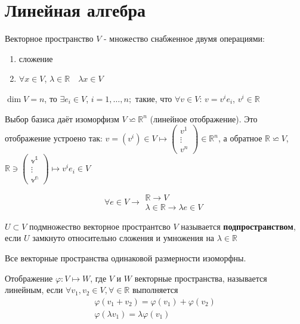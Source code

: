 \section{Линейная алгебра}
\begin{definition}
	Векторное пространство $ V $ - множество снабженное двумя операциями:
	\begin{enumerate}
		\item сложение
		\item $\forall x \in V$, $\lambda \in \mathbb{R} \quad \lambda x \in V$
	\end{enumerate}
\end{definition}
\begin{definition}
	$\operatorname{dim} V = n$,  то $\exists e_i \in V$, $ i = 1, \dots , n ;$ такие, что $ \forall v \in V $: $v = v^i e_i$, $v^i \in \mathbb{R}$
\end{definition}
 Выбор базиса даёт изоморфизм $V\backsimeq \mathbb{R}^n$ (линейное отображение). Это отображение устроено так: $ \displaystyle v = \left(v^i\right) \in V \longmapsto \left(\begin{array}{c}{v^{1}} \\ {\vdots} \\ {v^{n}}\end{array}\right) \in \mathbb{R}^{n}$, а обратное $ \mathbb{R} \backsimeq V $, $\mathbb{R \ni \left(\begin{array}{c}{v^{1}} \\ {\vdots} \\ {v^{n}}\end{array}\right)} \longmapsto v^i e_i \in V$
 
 $$
 \forall e \in V \longrightarrow \begin{array}{l}{\mathbb{R} \rightarrow V} \\ {\lambda \in \mathbb{R} \rightarrow \lambda e \in V}\end{array}
 $$
 
\begin{definition}
 	$U \subset V$ подмножество векторное пространтсво $ V $ называется \textbf{подпространством}, если $ U$ замкнуто относительно сложения и умножения на $ \lambda \in \mathbb{R}$
\end{definition}

\begin{statement}
	Все векторные пространства  одинаковой размерности изоморфны.
\end{statement}

\begin{definition}
	Отображение $ \varphi: V \mapsto W $, где $ V $ и $ W $ векторные пространства, называется линейным, если $\forall v_1 , v_2 \in V, \forall \in \mathbb{R}$ выполняется
	$$
	\begin{array}{l}{\varphi\left(v_{1}+v_{2}\right)=\varphi\left(v_{1}\right)+\varphi\left(v_{2}\right)} \\ {\varphi\left(\lambda v_{1}\right)=\lambda \varphi\left(v_{1}\right)}\end{array}
	$$
	
\end{definition}

